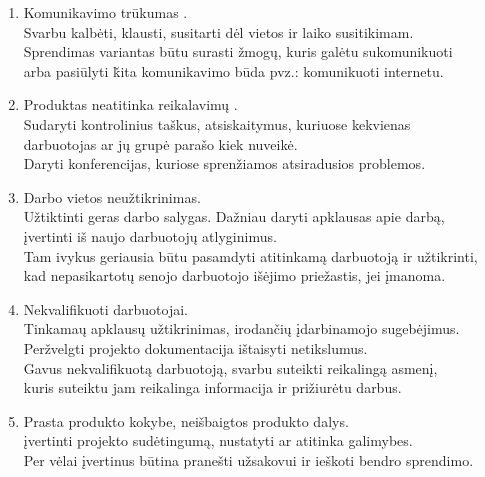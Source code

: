 \documentclass[a4paper,12pt]{article}
\begin{document}
\begin{enumerate}

	\item Komunikavimo tr\= ukumas . \\
  		Svarbu kalb\. eti, klausti, susitarti d\. el vietos ir laiko susitikimam.\\
  		Sprendimas variantas b\= utu surasti \v zmog\k u, kuris gal\. etu sukomunikuoti \\
  		arba pasi\= ulyti \v kita komunikavimo b\= uda pvz.: komunikuoti internetu. 
  		
  	\item Produktas neatitinka reikalavim\k u . \\
  		Sudaryti kontrolinius ta\v skus, atsiskaitymus, kuriuose kekvienas \\ 
  		darbuotojas ar j\k u grup\. e parašo kiek nuveik\. e.\\
  		Daryti konferencijas, kuriose spren\v ziamos atsiradusios problemos.
  		
	\item Darbo vietos neu\v ztikrinimas.\\
  		U\v ztiktinti geras darbo salygas. Dažniau daryti apklausas apie darb\k a,\\ 
  		\k ivertinti iš naujo darbuotoj\k u atlyginimus.\\
  		Tam ivykus geriausia b\= utu pasamdyti atitinkam\k a darbuotoj\k a ir u\v ztikrinti,\\
  		kad nepasikartot\k u senojo darbuotojo i\v s\. ejimo prie\v zastis, jei \k imanoma.
  		
	\item Nekvalifikuoti darbuotojai. \\
  		Tinkama\k u apklaus\k u u\v ztikrinimas, irodan\v ci\k u \k idarbinamojo sugeb\. ejimus. \\ Per\v zvelgti projekto dokumentacija i\v staisyti netikslumus.\\
  		Gavus nekvalifikuot\k a darbuotoj\k a, svarbu suteikti reikaling\k a asmen\k i, \\
  		kuris suteiktu jam reikalinga informacija ir pri\v ziur\. etu darbus.

	\item Prasta produkto kokybe, nei\v sbaigtos produkto dalys.\\
		\k ivertinti projekto sud\. etingum\k a, nustatyti ar atitinka galimybes.\\
		Per v\. elai  \k ivertinus b\= utina prane\v sti u\v zsakovui ir ie\v skoti bendro 				sprendimo.
  		

\end{enumerate}
\end{document}
